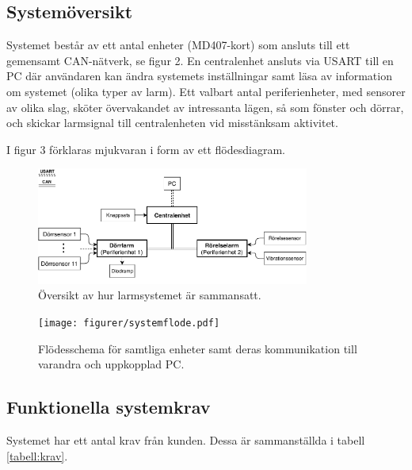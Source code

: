 \subsection{Systemöversikt}

Systemet består av ett antal enheter (MD407-kort) som ansluts till ett gemensamt CAN-nätverk, se figur 2. En centralenhet ansluts via USART till en PC där användaren kan ändra systemets inställningar samt läsa av information om systemet (olika typer av larm). Ett valbart antal periferienheter, med sensorer av olika slag, sköter övervakandet av intressanta lägen, så som fönster och dörrar, och skickar larmsignal till centralenheten vid misstänksam aktivitet.

I figur 3 förklaras mjukvaran i form av ett flödesdiagram.

\begin{figure}[ht]
	\centering\includegraphics[width=0.8\textwidth]{figurer/systemoversiktfigur1.pdf}
	\caption{Översikt av hur larmsystemet är sammansatt.}
	\label{figur:översikt}
\end{figure}

\begin{figure}[h!]
	\centering\texttt{[image: figurer/systemflode.pdf]}
	\caption{Flödesschema för samtliga enheter samt deras kommunikation till varandra och uppkopplad PC.}
	\label{figur:flöde}
\end{figure}

\newpage
\subsection{Funktionella systemkrav}

Systemet har ett antal krav från kunden. Dessa är sammanställda i tabell \ref{tabell:krav}.

